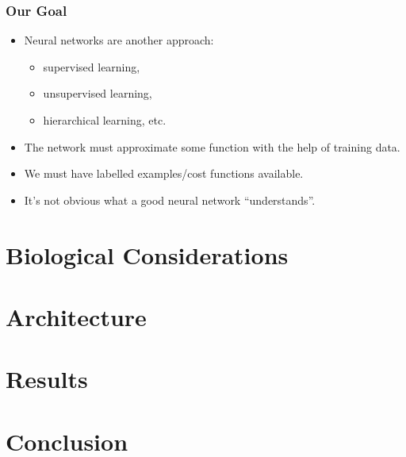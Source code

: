 \documentclass[handout]{beamer}
\begin{document}
   \begin{frame}
      \frametitle{Our Goal}
      
   	\begin{itemize}
   		\item Neural networks are another approach:
   		\begin{itemize}
   			\item supervised learning,
   			\item unsupervised learning,
   			\item hierarchical learning, etc.
   		\end{itemize}
   		\pause
   		\item The network must approximate some function with the help of training data.
   		\pause
   		\item We must have labelled examples/cost functions available.
   		\pause
   		\item It's not obvious what a good neural network ``understands''.
   	\end{itemize}
   \end{frame}
   
   \section{Biological Considerations}
   \section{Architecture}
   \section{Results}
   \section{Conclusion}
   
%      
%      
%      
%      
%      
   
\end{document}
